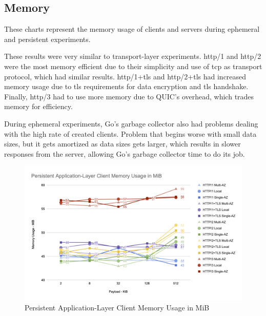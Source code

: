 \subsection{Memory}

These charts represent the memory usage of clients and servers during ephemeral and persistent experiments.

These results were very similar to transport-layer experiments. \gls{http}/1 and \gls{http}/2 were the most memory efficient due to their simplicity and use of \gls{tcp} as transport protocol, which had similar results. \gls{http}/1+\gls{tls} and \gls{http}/2+\gls{tls} had increased memory usage due to \gls{tls} requirements for data encryption and \gls{tls} handshake. Finally, \gls{http}/3 had to use more memory due to QUIC’s overhead, which trades memory for efficiency.

During ephemeral experiments, Go’s garbage collector also had problems dealing with the high rate of created clients. Problem that begins worse with small data sizes, but it gets amortized as data sizes gets larger, which results in slower responses from the server, allowing Go’s garbage collector time to do its job.

\clearpage

\begin{figure}[h!]
    \centering
    \includegraphics[width=\linewidth]{figures/charts/Persistent Application-Layer Client Memory Usage in MiB.png}
    \caption{Persistent Application-Layer Client Memory Usage in MiB}
    \label{fig:persistent_client_app_memory}
\end{figure}

